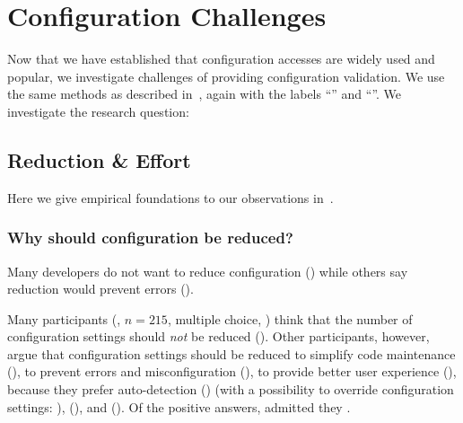 \section{Configuration Challenges}
\label{sec:configuration-challenges}

Now that we have established that configuration accesses are widely used and popular, we investigate challenges of providing configuration validation.
We use the same methods as described in~, again with the labels ``\methodSource{}'' and ``\methodQuestion{}''.
We investigate the research question:
\rqMotivationChallenges*

\subsection{Reduction \& Effort}

Here we give empirical foundations to our observations in~.

\subsubsection{Why should configuration be reduced?}
\label{concerns}

\begin{finding}
Many developers do not want to reduce configuration () while others say reduction would prevent errors ().
\end{finding}


\methodQuestion{}
Many participants (, $n = 215$, multiple choice, ) think that the number of configuration settings should \emph{not} be reduced ().
Other participants, however, argue that configuration settings should be reduced
to simplify code maintenance (),
to prevent errors and misconfiguration (),
to provide better user experience (),
because they prefer auto-detection () (with a possibility to override configuration settings: ),
 (),
and  ().
Of the positive answers,  admitted they .

